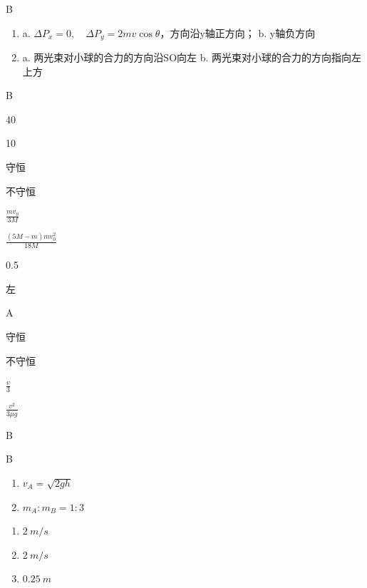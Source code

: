 \item B
\item \begin {enumerate} \renewcommand {\labelenumi }{\arabic {enumi}.} \item a. $\Delta P _ { x } = 0 , \quad \Delta P _ { y } = 2 m v \cos \theta $，方向沿y轴正方向； b. y轴负方向 \item a. 两光束对小球的合力的方向沿SO向左 b. 两光束对小球的合力的方向指向左上方 \par \par \end {enumerate} \par \par 
\item B
\item 40
\item 10
\item 守恒
\item 不守恒
\item $\frac { m v _ { 0 } } { 3 M }$
\item $\frac { ( 5 M - m ) m v _ { 0 } ^ { 2 } } { 18 M }$
\item 0.5
\item 左
\item A
\item 守恒
\item 不守恒
\item $ \frac {v}{3} $
\item $\frac { v ^ { 2 } } { 3 \mu g }$
\item B
\item B
\item \begin {enumerate} \renewcommand {\labelenumi }{\arabic {enumi}.} \item $v _ { A } = \sqrt { 2 g h }$ \item $m _ { A }: m _ { B } = 1: 3$ \par \par \end {enumerate} \par \par 
\item \begin {enumerate} \renewcommand {\labelenumi }{\arabic {enumi}.} \item $ 2\ m/s $ \item $ 2\ m/s $ \item $ 0.25\ m $ \end {enumerate} \par \par 
